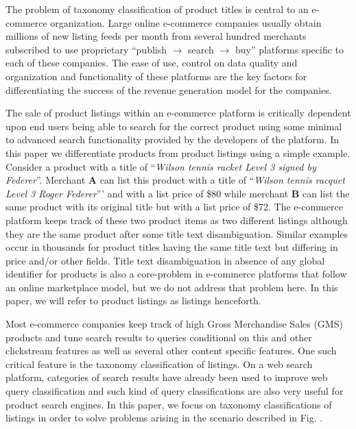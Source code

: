 The problem of taxonomy classification of product titles is central to an e-commerce organization. 
Large online e-commerce companies usually obtain millions of new listing feeds per month from several hundred merchants subscribed to use proprietary ``publish $\rightarrow$ search $\rightarrow$ buy'' platforms specific to each of these companies. 
The ease of use, control on data quality and organization and functionality of these platforms are the key factors for differentiating the success of the revenue generation model for the companies.

The sale of product listings within an e-commerce platform is critically dependent upon end users being able to search for the correct product using some minimal to advanced search functionality provided by the developers of the platform. 
In this paper we differentiate products from product listings using a simple example. 
Consider a product with a title of ``\textit{Wilson tennis racket Level 3 signed by Federer}''. 
Merchant \textbf{A} can list this product with a title of ``\textit{Wilson tennis racquet Level 3 Roger Federer}''' and with a list price of \$80 while merchant \textbf{B} can list the same product with its original title but with a list price of \$72.
The e-commerce platform keeps track of these two product items as two different listings although they are the same product after some title text disambiguation.
Similar examples occur in thousands for product titles having the same title text but differing in price and/or other fields.
Title text disambiguation in absence of any global identifier for products is also a core-problem in e-commerce platforms that follow an online marketplace model, but we do not address that problem here.
In this paper, we will refer to product listings as listings henceforth. 

Most e-commerce companies keep track of high Gross Merchandise Sales (GMS) products and tune search results to queries conditional on this and other clickstream features as well as several other content specific features.
One such critical feature is the taxonomy classification of listings.
On a web search platform, categories of search results have already been used to improve web query classification \cite{Ganti10} and such kind of query classifications are also very useful for product search engines. 
In this paper, we focus on taxonomy classifications of listings in order to solve problems arising in the  scenario described in Fig. .

